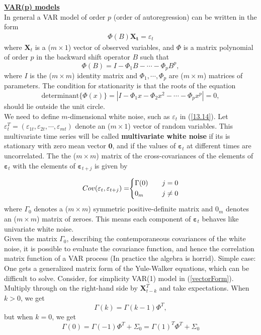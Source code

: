 \bigskip
\noindent
\textbf{\underline{VAR(p) models}}\\

In general a VAR model of order $p$ (order of autoregression) can be written in the form \begin{align}
    \Phi(B) \mathbf{X_t} = \varepsilon_t \label{13.14}
\end{align} where $\mathbf{X}_t$ is a ($m\times 1$) vector of observed variables, and $\Phi$ is a matrix polynomial of order $p$ in the backward shift operator $B$ such that \[
\Phi(B)=I- \Phi_1 B- \cdots - \Phi_p B^p,
\] where $I$ is the ($m\times m$) identity matrix and $\Phi_1, \cdots, \Phi_p$ are ($m\times m$) matrices of parameters. The condition for stationarity is that the roots of the equation \[
\text{determinant}\{\Phi(x)\} = |I-\Phi_1x - \Phi_2 x^2 - \cdots - \Phi_px^p|=0,
\] should lie outside the unit circle.\\

We need to define $m$-dimensional white noise, such as $\varepsilon_t$ in (\ref{13.14}). Let $\varepsilon_t^T=(\varepsilon_{1t},\varepsilon_{2t},\cdots,\varepsilon_{mt})$ denote an ($m \times 1$) vector of random variables. This multivariate time series will be called \textbf{multivariate white noise} if its is stationary with zero mean vector $\mathbf{0}$, and if the values of $\mathbf{\varepsilon}_t$ at different times are uncorrelated. The the ($m\times m$) matrix of the cross-covariances of the elements of $\mathbf{\varepsilon}_t$ with the elements of $\mathbf{\varepsilon}_{t+j}$ is given by 

\begin{subequations}
\begin{equation}
\begin{array}{r@{}l}
Cov(\mathbf{\varepsilon}_t, \mathbf{\varepsilon}_{t+j}) = & \left\{
\begin{aligned}
    &\Gamma(0) & \quad & j=0 \nonumber \\
    &0_m & \quad & j \neq 0 \nonumber
\end{aligned}
\right.
\end{array}
\end{equation}
\end{subequations}
where $\Gamma_0$ denotes a ($m\times m$) symmetric positive-definite matrix and $0_m$ denotes an ($m \times m$) matrix of zeroes. This means each component of $\mathbf{\varepsilon}_t$ behaves like univariate white noise.\\

Given the matrix $\Gamma_0$, describing the contemporaneous covariances of the white noise, it is possible to evaluate the covariance function, and hence the correlation matrix function of a VAR process (In practice the algebra is horrid). Simple case: One gets a generalized matrix form of the Yule-Walker equations, which can be difficult to solve. Consider, for simplicity VAR(1) model in (\ref{vectorForm}). Multiply through on the right-hand side by $\mathbf{X}_{t-k}^T$ and take expectations. When $k>0$, we get \[
\Gamma(k)=\Gamma(k-1) \Phi^T,
\] but when $k=0$, we get \[
\Gamma(0) =\Gamma(-1)\Phi^T + \Sigma_0 =\Gamma(1)^T \Phi^T + \Sigma_0
\]

